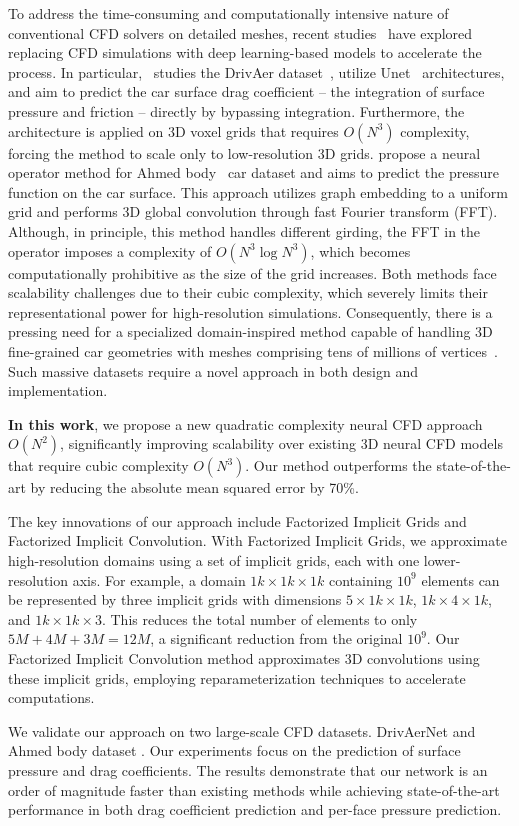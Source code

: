 To address the time-consuming and computationally intensive nature of conventional CFD solvers on detailed meshes, recent studies~\citep{jacob2021deep,li2023geometry} have explored replacing CFD simulations with deep learning-based models to accelerate the process.
In particular,~\citet{jacob2021deep} studies the DrivAer dataset~\citep{heft2012introduction}, utilize Unet~\citep{ronneberger2015u} architectures, and aim to predict the car surface drag coefficient -- the integration of surface pressure and friction -- directly by bypassing integration. Furthermore, the architecture is applied on 3D voxel grids that requires $O(N^3)$ complexity, forcing the method to scale only to low-resolution 3D grids.
\citet{li2023geometry} propose a neural operator method for Ahmed body~\citep{ahmed1984some} car dataset and aims to predict the pressure function on the car surface. This approach utilizes graph embedding to a uniform grid and performs 3D global convolution through fast Fourier transform (FFT). Although, in principle, this method handles different girding, the FFT in the operator imposes a complexity of $O(N^3 \log N^3)$, which becomes computationally prohibitive as the size of the grid increases.
Both methods face scalability challenges due to their cubic complexity, which severely limits their representational power for high-resolution simulations.
Consequently, there is a pressing need for a specialized domain-inspired method capable of handling 3D fine-grained car geometries with meshes comprising tens of millions of vertices~\citep{jacob2021deep}. Such massive datasets require a novel approach in both design and implementation.

\textbf{In this work}, we propose a new quadratic complexity neural CFD approach $O(N^2)$, significantly improving scalability over existing 3D neural CFD models that require cubic complexity $O(N^3)$. Our method outperforms the state-of-the-art by reducing the absolute mean squared error by 70\%.

The key innovations of our approach include Factorized Implicit Grids and Factorized Implicit Convolution. With Factorized Implicit Grids, we approximate high-resolution domains using a set of implicit grids, each with one lower-resolution axis. For example, a domain $1k \times 1k \times 1k$ containing $10^9$ elements can be represented by three implicit grids with dimensions $5 \times 1k \times 1k$, $1k \times 4 \times 1k$, and $1k \times 1k \times 3$. This reduces the total number of elements to only $5M + 4M + 3M = 12M$, a significant reduction from the original $10^9$. Our Factorized Implicit Convolution method approximates 3D convolutions using these implicit grids, employing reparameterization techniques to accelerate computations.

We validate our approach on two large-scale CFD datasets. DrivAerNet \citep{heft2012introduction,elrefaie2024drivaernet} and Ahmed body dataset \citep{ahmed1984some}. Our experiments focus on the prediction of surface pressure and drag coefficients. The results demonstrate that our network is an order of magnitude faster than existing methods while achieving state-of-the-art performance in both drag coefficient prediction and per-face pressure prediction.
